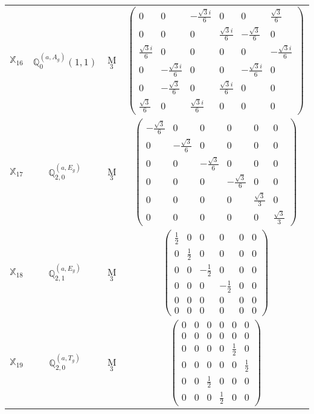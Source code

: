 \documentclass[fleqn,10pt,landscape]{article}
\begin{document}
\begin{itemize}
\begin{center}
\begin{longtable}{c|c|c|c}
$ \mathbb{X}_{16} $ & $\mathbb{Q}_{0}^{(a,A_{g})}(1,1)$ & M$_{3}$ & $\begin{pmatrix} 0 & 0 & - \frac{\sqrt{3} i}{6} & 0 & 0 & \frac{\sqrt{3}}{6} \\ 0 & 0 & 0 & \frac{\sqrt{3} i}{6} & - \frac{\sqrt{3}}{6} & 0 \\ \frac{\sqrt{3} i}{6} & 0 & 0 & 0 & 0 & - \frac{\sqrt{3} i}{6} \\ 0 & - \frac{\sqrt{3} i}{6} & 0 & 0 & - \frac{\sqrt{3} i}{6} & 0 \\ 0 & - \frac{\sqrt{3}}{6} & 0 & \frac{\sqrt{3} i}{6} & 0 & 0 \\ \frac{\sqrt{3}}{6} & 0 & \frac{\sqrt{3} i}{6} & 0 & 0 & 0 \end{pmatrix}$ \\
$ \mathbb{X}_{17} $ & $\mathbb{Q}_{2,0}^{(a,E_{g})}$ & M$_{3}$ & $\begin{pmatrix} - \frac{\sqrt{3}}{6} & 0 & 0 & 0 & 0 & 0 \\ 0 & - \frac{\sqrt{3}}{6} & 0 & 0 & 0 & 0 \\ 0 & 0 & - \frac{\sqrt{3}}{6} & 0 & 0 & 0 \\ 0 & 0 & 0 & - \frac{\sqrt{3}}{6} & 0 & 0 \\ 0 & 0 & 0 & 0 & \frac{\sqrt{3}}{3} & 0 \\ 0 & 0 & 0 & 0 & 0 & \frac{\sqrt{3}}{3} \end{pmatrix}$ \\
$ \mathbb{X}_{18} $ & $\mathbb{Q}_{2,1}^{(a,E_{g})}$ & M$_{3}$ & $\begin{pmatrix} \frac{1}{2} & 0 & 0 & 0 & 0 & 0 \\ 0 & \frac{1}{2} & 0 & 0 & 0 & 0 \\ 0 & 0 & - \frac{1}{2} & 0 & 0 & 0 \\ 0 & 0 & 0 & - \frac{1}{2} & 0 & 0 \\ 0 & 0 & 0 & 0 & 0 & 0 \\ 0 & 0 & 0 & 0 & 0 & 0 \end{pmatrix}$ \\
$ \mathbb{X}_{19} $ & $\mathbb{Q}_{2,0}^{(a,T_{g})}$ & M$_{3}$ & $\begin{pmatrix} 0 & 0 & 0 & 0 & 0 & 0 \\ 0 & 0 & 0 & 0 & 0 & 0 \\ 0 & 0 & 0 & 0 & \frac{1}{2} & 0 \\ 0 & 0 & 0 & 0 & 0 & \frac{1}{2} \\ 0 & 0 & \frac{1}{2} & 0 & 0 & 0 \\ 0 & 0 & 0 & \frac{1}{2} & 0 & 0 \end{pmatrix}$ \\

\end{longtable}
\end{center}
\end{itemize}
\end{document}

